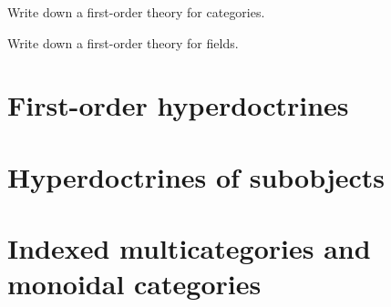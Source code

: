 \begin{ex}\label{ex:fol-cats}
  Write down a first-order theory for categories.
\end{ex}

\begin{ex}\label{ex:fol-fields}
  Write down a first-order theory for fields.
\end{ex}


\section{First-order hyperdoctrines}
\label{sec:hyperdoctrines}




\newpage


\begin{rmk}\label{rmk:subset-quotient}
\end{rmk}


\section{Hyperdoctrines of subobjects}
\label{sec:sub}


\section{Indexed multicategories and monoidal categories}
\label{sec:indexed-moncat}

